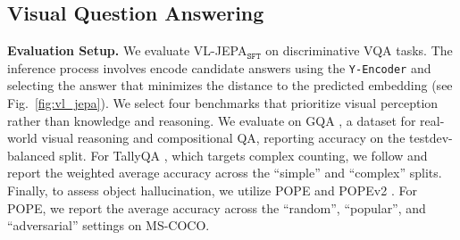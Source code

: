 \begin{table}[h!]
\centering
\caption{\textbf{\textsc{WorldPrediction-WM} benchmark results}. We compare the accuracy between large VLMs, socratic LLMs, and VL-JEPA. VL-JEPA$_\texttt{SFT}$ achieves a new SoTA at 65.7\%.}
\label{tab:worldprediction}
\end{table}




\subsection{Visual Question Answering}
\label{sec:exp.vqa}


\textbf{Evaluation Setup.} We evaluate VL-JEPA$_\texttt{SFT}$ on discriminative VQA tasks. The inference process involves encode candidate answers using the \texttt{Y-Encoder} and selecting the answer that minimizes the distance to the predicted embedding (see Fig.~\ref{fig:vl_jepa}). We select four benchmarks that prioritize visual perception rather than knowledge and reasoning. We evaluate on GQA \citep{hudson2019gqa}, a dataset for real-world visual reasoning and compositional QA, reporting accuracy on the testdev-balanced split. For TallyQA \citep{acharya2019tallyqa}, which targets complex counting, we follow \cite{chen2022pali} and report the weighted average accuracy across the ``simple'' and ``complex'' splits. Finally, to assess object hallucination, we utilize POPE \citep{li2023evaluating} and POPEv2 \citep{li2025analyzing}. For POPE, we report the average accuracy across the ``random'', ``popular'', and ``adversarial'' settings on MS-COCO.

